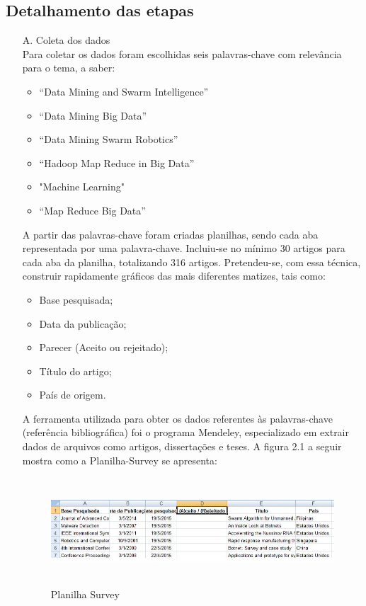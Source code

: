 \subsection{Detalhamento das etapas}

\begin{enumerate}
 \item[A.] Coleta dos dados\\
    Para coletar os dados foram escolhidas seis palavras-chave com relevância para o tema, a saber:
    \begin{itemize}
      \item “Data Mining and Swarm Intelligence”
      \item “Data Mining Big Data”
      \item “Data Mining Swarm Robotics”
      \item “Hadoop Map Reduce in Big Data”    
      \item "Machine Learning"
      \item “Map Reduce Big Data”
    \end{itemize}


    A partir das palavras-chave foram criadas planilhas, sendo cada aba representada por uma palavra-chave. 
    Incluiu-se no mínimo 30 artigos para cada aba da planilha, totalizando 316 artigos.
    Pretendeu-se, com essa técnica, construir rapidamente gráficos das mais diferentes matizes, tais como:
    \begin{itemize}
      \item Base pesquisada;
      \item Data da publicação;
      \item Parecer (Aceito ou rejeitado);
      \item Título do artigo;
      \item País de origem.
    \end{itemize}

    A ferramenta utilizada para obter os dados referentes às palavras-chave (referência bibliográfica) foi o programa Mendeley, especializado 
    em extrair dados de arquivos como artigos, dissertações e teses.
    A figura 2.1 a seguir mostra como a Planilha-Survey se apresenta:
  
    \begin{figure}[!ht]
      \centering %
      \caption{Planilha Survey}
      \includegraphics[width=110mm, height=40mm]{Figuras/BigData/PlanilhaSrvey.jpg}
    \end{figure}
  

\end{enumerate}
